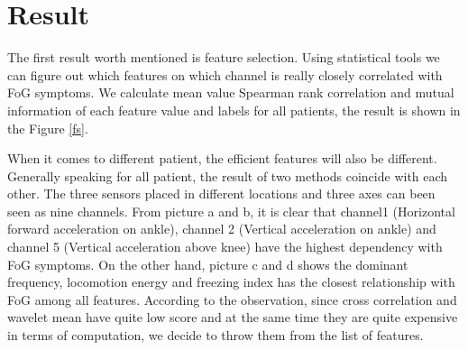 \documentclass[article]{article}
\begin{document}
	
\section{Result}
    
	The first result worth mentioned is feature selection. Using statistical tools we can figure out which features on which channel is really closely correlated with FoG symptoms.
    We calculate mean value Spearman rank correlation and mutual information of each feature value and labels for all patients, the result is shown in the Figure \ref{fs}. 
    
    When it comes to different patient, the efficient features will also be different. Generally speaking for all patient, the result of two methods coincide with each other. The three sensors placed in different locations and three axes can been seen as nine channels. From picture a and b, it is clear that channel1 (Horizontal forward acceleration on ankle), channel 2 (Vertical acceleration on ankle) and channel 5 (Vertical acceleration above knee) have the highest dependency with FoG symptoms. On the other hand, picture c and d shows the dominant frequency, locomotion energy and freezing index has the closest relationship with FoG among all features. According to the observation, since cross correlation and wavelet mean have quite low score and at the same time  they are quite expensive in terms of computation, we decide to throw them from the list of features.
    
\end{document}
